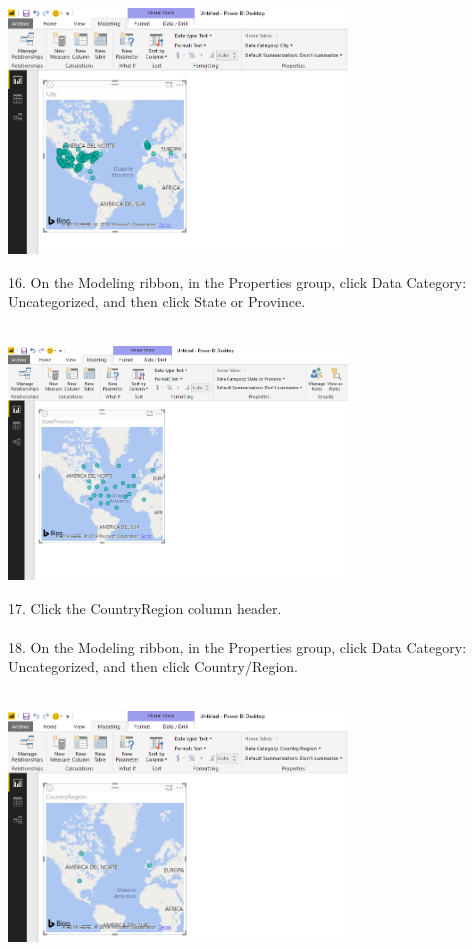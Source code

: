\documentclass[12pt,letterpaper]{article}
\begin{document}
\begin{center}
\includegraphics[width=9cm]{IMG/7.png} 
\end{center}
16. On the Modeling ribbon, in the Properties group, click Data Category: Uncategorized, and then click State or Province.\\\\
\begin{center}
\includegraphics[width=9cm]{IMG/8.png} 
\end{center}
17. Click the CountryRegion column header.\\\\
18. On the Modeling ribbon, in the Properties group, click Data Category: Uncategorized, and then click Country/Region.\\\\
\begin{center}
\includegraphics[width=9cm]{IMG/9.png} 
\end{center}
\end{document}
